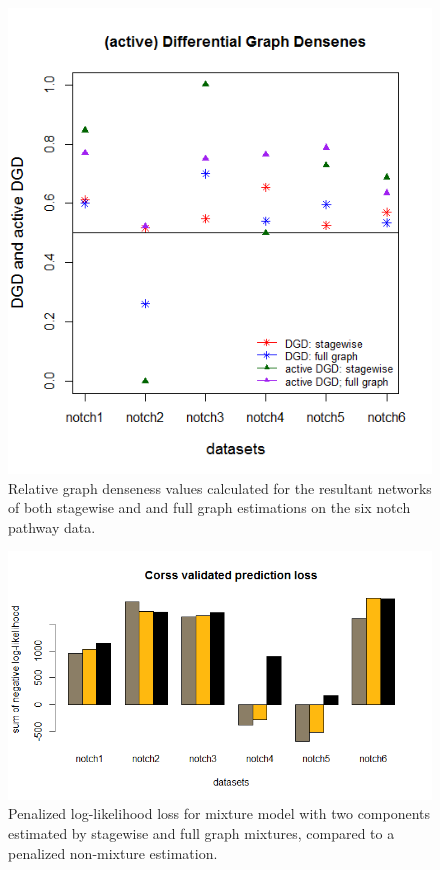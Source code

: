 \documentclass[10pt]{article}
\begin{document}
\begin{figure}
\begin{center}
 \includegraphics[scale=.8]{DGD.png}
\end{center}
\caption{Relative graph denseness values calculated for the resultant networks of both stagewise and and full graph estimations on the six notch pathway data.}
\label{fig:DGD}
\end{figure}


\begin{figure}
\begin{center}
 \includegraphics[width=120mm]{cv-loss.png}
\end{center}
\caption{Penalized log-likelihood loss for mixture model with two components estimated by stagewise and full graph mixtures, compared to a penalized non-mixture estimation.}
\label{fig:pll}
\end{figure}
\end{document}
